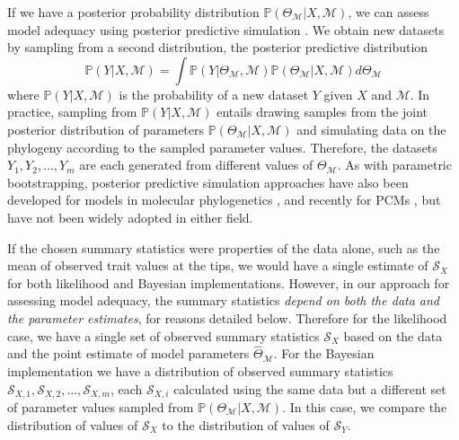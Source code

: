\documentclass[a4paper,12pt]{article}
\begin{document}
If we have a posterior probability distribution $\mathbb{P}(\Theta_{\mathcal{M}}|X, \mathcal{M})$, we can assess model adequacy using posterior predictive simulation \citep{Rubin1984, Gelman1996}. We obtain new datasets by sampling from a second distribution, the posterior predictive distribution
\begin{equation}
\mathbb{P}(Y|X,\mathcal{M}) = \int \mathbb{P}(Y|\Theta_{\mathcal{M}}, \mathcal{M})\mathbb{P}(\Theta_{\mathcal{M}}|X,\mathcal{M})d\Theta_{\mathcal{M}}
\end{equation}
where $\mathbb{P}(Y|X,\mathcal{M})$ is the probability of a new dataset $Y$ given $X$ and $\mathcal{M}$. In practice, sampling from $\mathbb{P}(Y|X,\mathcal{M})$ entails drawing samples from the joint posterior distribution of parameters $\mathbb{P}(\Theta_{\mathcal{M}}|X, \mathcal{M})$ and simulating data on the phylogeny according to the sampled parameter values. Therefore, the datasets $Y_1, Y_2, \ldots, Y_m$ are each generated from different values of $\Theta_{\mathcal{M}}$.  As with parametric bootstrapping, posterior predictive simulation approaches have also been developed for models in molecular phylogenetics \citep{Bollback2002, Reid2013, Lewis2013, Brown2013}, and recently for PCMs \citep{SlaterPennell}, but have not been widely adopted in either field.

If the chosen summary statistics were properties of the data alone, such as the mean of observed trait values at the tips, we would have a single estimate of $\mathcal{S}_X$ for both likelihood and Bayesian implementations. However, in our approach for assessing model adequacy, the summary statistics \emph{depend on both the data and the parameter estimates}, for reasons detailed below. Therefore for the likelihood case, we have a single set of observed summary statistics $\mathcal{S}_X$ based on the data and the point estimate of model parameters $\hat{\Theta}_{\mathcal{M}}$. For the Bayesian implementation we have a distribution of observed summary statistics $\mathcal{S}_{X,1}, \mathcal{S}_{X,2}, \ldots, \mathcal{S}_{X,m}$, each $\mathcal{S}_{X,i}$ calculated using the same data but a different set of parameter values sampled from $\mathbb{P}(\Theta_{\mathcal{M}}|X, \mathcal{M})$. In this case, we compare the distribution of values of $\mathcal{S}_X$ to the distribution of values of $\mathcal{S}_Y$.
\end{document}
